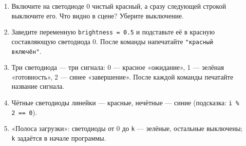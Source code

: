 \begin{taskbox}
\begin{enumerate}
  \item Включите на светодиоде 0 чистый красный, а сразу следующей строкой выключите его. Что видно в сцене? Уберите выключение.
  \item Заведите переменную \verb|brightness = 0.5| и подставьте её в красную составляющую светодиода 0. После команды напечатайте \verb|"красный включён"|.
  \item Три светодиода --- три сигнала: 0 --- красное «ожидание», 1 --- зелёная «готовность», 2 --- синее «завершение». После каждой команды печатайте название сигнала.
  \item Чётные светодиоды линейки --- красные, нечётные --- синие (подсказка: \verb|i % 2 == 0|).
  \item «Полоса загрузки»: светодиоды от 0 до \verb|k| --- зелёные, остальные выключены; \verb|k| задаётся в начале программы.
\end{enumerate}
\end{taskbox}
